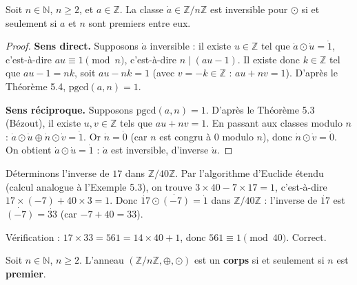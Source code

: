 \documentclass[a4paper,12pt,openany]{book}
\begin{document}
\begin{theoreme}
Soit $n\in\mathbb{N}$, $n\geq2$, et $a\in\mathbb{Z}$. La classe
$\dot a \in \mathbb{Z}/n\mathbb{Z}$ est inversible pour $\odot$ si et
seulement si $a$ et $n$ sont premiers entre eux.
\end{theoreme}

\begin{proof}
\textbf{Sens direct.} Supposons $\dot a$ inversible : il existe
$u\in\mathbb{Z}$ tel que $\dot a \odot \dot u = \dot 1$, c'est-à-dire
$au \equiv 1 \pmod n$, c'est-à-dire $n \mid (au-1)$. Il existe donc
$k\in\mathbb{Z}$ tel que $au-1=nk$, soit $au-nk=1$ (avec
$v=-k\in\mathbb{Z}$ : $au+nv=1$). D'après le Théorème 5.4,
$\mathrm{pgcd}(a,n)=1$.

\textbf{Sens réciproque.} Supposons $\mathrm{pgcd}(a,n)=1$. D'après le
Théorème 5.3 (Bézout), il existe $u,v\in\mathbb{Z}$ tels que $au+nv=1$.
En passant aux classes modulo $n$ : $\dot a \odot \dot u \oplus \dot n
\odot \dot v = \dot 1$. Or $\dot n = \dot 0$ (car $n$ est congru à $0$
modulo $n$), donc $\dot n \odot \dot v = \dot 0$. On obtient
$\dot a \odot \dot u = \dot 1$ : $\dot a$ est inversible, d'inverse
$\dot u$.
\end{proof}

\begin{exemple}[5.4]
Déterminons l'inverse de $17$ dans $\mathbb{Z}/40\mathbb{Z}$. Par
l'algorithme d'Euclide étendu (calcul analogue à l'Exemple 5.3), on
trouve $3\times40 - 7\times17 = 1$, c'est-à-dire $17\times(-7) + 40\times3
= 1$. Donc $\dot{17} \odot \dot{(-7)} = \dot 1$ dans
$\mathbb{Z}/40\mathbb{Z}$ : l'inverse de $\dot{17}$ est $\dot{(-7)} =
\dot{33}$ (car $-7+40=33$).

Vérification : $17\times33 = 561 = 14\times40+1$, donc $561 \equiv 1
\pmod{40}$. Correct.
\end{exemple}

\begin{theoreme}
Soit $n\in\mathbb{N}$, $n\geq2$. L'anneau $(\mathbb{Z}/n\mathbb{Z},
\oplus,\odot)$ est un \textbf{corps} si et seulement si $n$ est
\textbf{premier}.
\end{theoreme}
\end{document}
